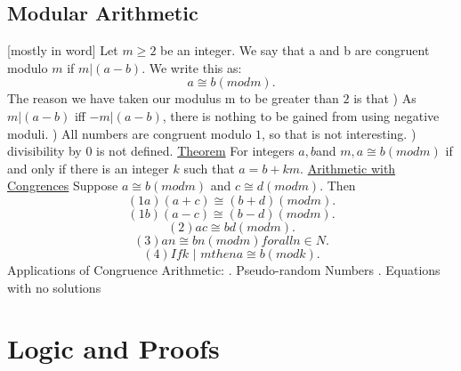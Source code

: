 \documentclass{article}
\begin{document}
\subsection{Modular Arithmetic}
[mostly in word]
\newline
\newline
Let $m \geq 2$ be an integer. We say that a and b are congruent modulo $m$ if $m | (a - b)$.
\newline
We write this as:
$$a \cong b (mod m).$$
The reason we have taken our modulus m to be greater than $2$ is that
)	As $m | (a - b)$ iff $- m | (a - b)$, there is nothing to be gained from using negative moduli.
)	All numbers are congruent modulo $1$, so that is not interesting.
)	divisibility by $0$ is not defined.
\newline
\newline
\underline{Theorem}
\newline
For integers $a, b$and $m, a \cong b (mod m)$ if and only if there is an integer $k$ such that $a = b + km$.
\newline
\newline
\underline{Arithmetic with Congrences}
\newline
Suppose $a \cong b (mod m)$ and $c \cong d (mod m)$.
\newline
Then
$$(1a) (a + c) \cong (b + d) (mod m).$$
$$(1b) (a - c) \cong (b - d) (mod m).$$
$$(2)	ac \cong bd (mod m).$$
$$(3)	an \cong bn (mod m) for all n \in N.$$
$$(4)	If k \text{ | } m then a \cong b (mod k).$$
\newline
\newline
Applications of Congruence Arithmetic:
. Pseudo-random Numbers
. Equations with no solutions
\newpage
\section{Logic and Proofs}
\end{document}

